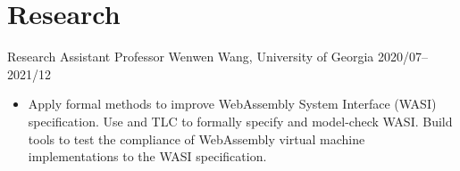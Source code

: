 \section{Research}

\begin{experiencelist}
    \experienceitem
        {Research Assistant}
        {Professor Wenwen Wang, University of Georgia}
        {2020/07--2021/12}
    \begin{itemize}[noitemsep, topsep=0pt]
        \item
            Apply formal methods to improve WebAssembly System Interface (WASI)
            specification. Use \tlaplus and TLC to formally specify and
            model-check WASI. Build tools to test the compliance of WebAssembly
            virtual machine implementations to the WASI specification.
    \end{itemize}
\end{experiencelist}
